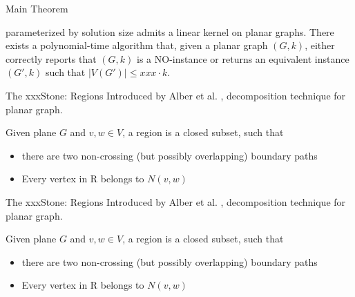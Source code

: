 \begin{frame}[c]{Main Theorem}
\begin{tcolorbox}[colback=TUMBlueLighter,title=The Main Theorem]
    \sdom parameterized by solution size admits a linear kernel on planar graphs.
    There exists a polynomial-time algorithm that, given a planar graph $(G, k)$, either correctly reports that $(G, k)$ is a NO-instance or returns an equivalent instance $(G', k)$ such that $|V(G')| \leq xxx \cdot k$.
\end{tcolorbox}
\end{frame}


\begin{frame}[c]{The xxxStone: Regions}
     Introduced by Alber et al. \cite{Alber2004}, decomposition technique for planar graph.

    \begin{tcolorbox}[colback=TUMBlueLighter,title=Region (Simplified)]
        Given plane $G$ and $v,w \in V$, a region is a closed subset, such that
        \begin{itemize}
            \item there are two non-crossing (but possibly overlapping) boundary paths
            \item Every vertex in R belongs to $N(v,w)$
        \end{itemize}
    \end{tcolorbox}

        \begin{figure}[!ht]
        \end{figure}

\end{frame}

\begin{frame}[c]{The xxxStone: Regions}
     Introduced by Alber et al. \cite{Alber2004}, decomposition technique for planar graph.

    \begin{tcolorbox}[colback=TUMBlueLighter,title=Region (Simplified)]
        Given plane $G$ and $v,w \in V$, a region is a closed subset, such that
    \begin{itemize}
        \item there are two non-crossing (but possibly overlapping) boundary paths
        \item Every vertex in R belongs to $N(v,w)$
    \end{itemize}
    \end{tcolorbox}

    \begin{figure}[!ht]
    \end{figure}


\end{frame}




